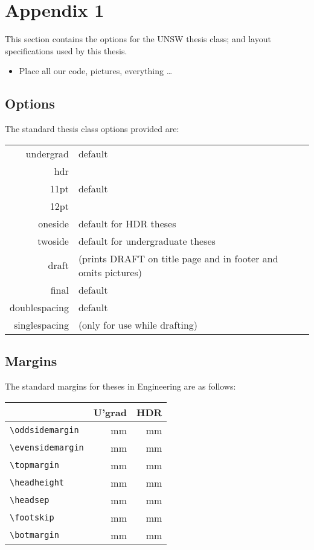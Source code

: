 \chapter{Appendix 1}\label{app1}

This section contains the options for the UNSW thesis class; and
layout specifications used by this thesis.

\begin{itemize}
  \item Place all our code, pictures, everything
\ldots
\end{itemize}

\section{Options}

The standard thesis class options provided are:

\qquad
\begin{tabular}{rl}
undergrad & default \\
hdr & \\[2ex]
11pt & default\\
12pt &\\[2ex]
oneside & default for HDR theses\\
twoside & default for undergraduate theses\\[2ex]
draft & (prints DRAFT on title page and in footer and omits pictures)\\
final & default\\[2ex]
doublespacing & default\\
singlespacing & (only for use while drafting)
\end{tabular}

\section{Margins}

The standard margins for theses in Engineering are as follows:

\qquad
\begin{tabular}{|l|r|r|}
\hline
 & U'grad & HDR\\\hline
{\verb+\oddsidemargin+} & \unit[40]{mm} & \unit[40]{mm}\\
{\verb+\evensidemargin+} & \unit[25]{mm} & \unit[20]{mm}\\
{\verb+\topmargin+} & \unit[25]{mm} & \unit[30]{mm}\\
{\verb+\headheight+} & \unit[40]{mm} & \unit[40]{mm}\\
{\verb+\headsep+} & \unit[40]{mm} & \unit[40]{mm}\\
{\verb+\footskip+} & \unit[15]{mm} & \unit[15]{mm}\\
{\verb+\botmargin+} & \unit[20]{mm} & \unit[20]{mm}\\
\hline
\end{tabular}

